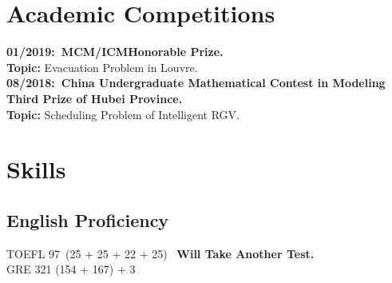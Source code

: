 \documentclass[a4paper]{article}
\begin{document}
\section{Academic Competitions}
\vspace{-0.5em}
\textbf{01/2019:\ MCM/ICM\hspace{2cm}Honorable Prize.}\\
\textbf{Topic:} Evacuation Problem in Louvre.\\
\textbf{08/2018:\ China Undergraduate Mathematical Contest in Modeling\\Third Prize of Hubei Province.}\\
\textbf{Topic:}  Scheduling Problem of Intelligent RGV.



\section{Skills}
\vspace{-0.5em}
\subsection{English Proficiency}
\vspace{-0.5em}
TOEFL 97\ (25 + 25 + 22 + 25) \ \textbf{Will Take Another Test.}\\
GRE 321 (154 + 167) + 3
\end{document}
